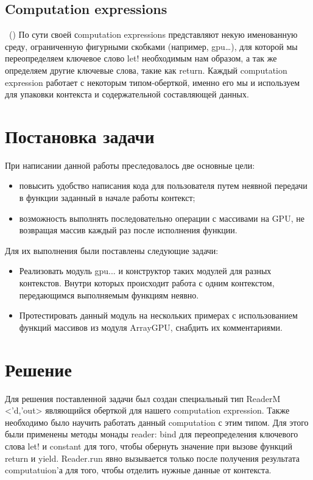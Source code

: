 \documentclass[14pt]{matmex-diploma}
\begin{document}
\subsection{Computation expressions}~(\cite{fsffap})
По сути своей сomputation expressions представляют некую именованную среду, ограниченную фигурными скобками (например, gpu{…}), для которой мы переопределяем ключевое слово let! необходимым нам образом, а так же определяем другие ключевые слова, такие как return. 
Каждый computation expression работает с некоторым типом-оберткой, именно его мы и используем для упаковки контекста и содержательной составляющей данных.

\section{Постановка задачи}
При написании данной работы преследовалось две основные цели:
\begin{itemize}
    \item повысить удобство написания кода для пользователя путем 	неявной передачи в функции заданный в начале работы контекст;
\item возможность выполнять последовательно операции с 	массивами на GPU, не 	возвращая массив каждый раз после исполнения функции. 	
\end{itemize}
Для их выполнения были поставлены следующие задачи:
\begin{itemize}
    \item Реализовать модуль gpu{...} и конструктор таких модулей для разных контекстов. Внутри которых происходит работа с одним контекстом, передающимся выполняемым функциям неявно.
    \item Протестировать данный модуль на нескольких примерах с использованием функций массивов из модуля ArrayGPU, снабдить их комментариями.
\end{itemize}

\section{Решение}
Для решения поставленной задачи был создан специальный тип  
ReaderM <’d,’out> являющийся оберткой для нашего computation expression. Также необходимо было научить работать данный computation с этим типом. Для этого были применены методы монады reader: bind для переопределения ключевого слова let! и constant для того, чтобы обернуть значение при вызове функций return и yield. Reader.run явно вызывается только после получения результата computatuion’а для того, чтобы отделить нужные данные от контекста.
\end{document}
